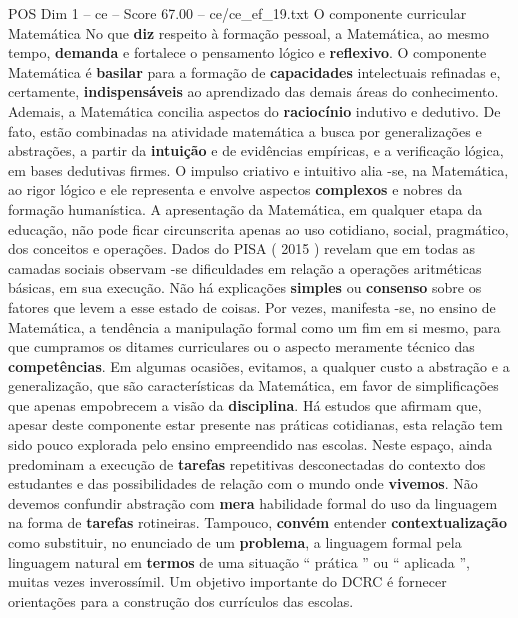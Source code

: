 \begin{textsample}{POS Dim 1 – ce – Score 67.00 – ce/ce\_ef\_19.txt}  \label{ex:f1_pos_047}
O componente curricular Matemática No que \textbf{diz} respeito à formação pessoal, a Matemática, ao mesmo tempo, \textbf{demanda} e fortalece o pensamento lógico e \textbf{reflexivo}.
O componente Matemática é \textbf{basilar} para a formação de \textbf{capacidades} intelectuais refinadas e, certamente, \textbf{indispensáveis} ao aprendizado das demais áreas do conhecimento.
Ademais, a Matemática concilia aspectos do \textbf{raciocínio} indutivo e dedutivo.
De fato, estão combinadas na atividade matemática a busca por generalizações e abstrações, a partir da \textbf{intuição} e de evidências empíricas, e a verificação lógica, em bases dedutivas firmes.
O impulso criativo e intuitivo alia -se, na Matemática, ao rigor lógico e ele representa e envolve aspectos \textbf{complexos} e nobres da formação humanística.
A apresentação da Matemática, em qualquer etapa da educação, não pode ficar circunscrita apenas ao uso cotidiano, social, pragmático, dos conceitos e operações.
Dados do PISA ( 2015 ) revelam que em todas as camadas sociais observam -se dificuldades em relação a operações aritméticas básicas, em sua execução.
Não há explicações \textbf{simples} ou \textbf{consenso} sobre os fatores que levem a esse estado de coisas.
Por vezes, manifesta -se, no ensino de Matemática, a tendência a manipulação formal como um fim em si mesmo, para que cumpramos os ditames curriculares ou o aspecto meramente técnico das \textbf{competências}.
Em algumas ocasiões, evitamos, a qualquer custo a abstração e a generalização, que são características da Matemática, em favor de simplificações que apenas empobrecem a visão da \textbf{disciplina}.
Há estudos que afirmam que, apesar deste componente estar presente nas práticas cotidianas, esta relação tem sido pouco explorada pelo ensino empreendido nas escolas.
Neste espaço, ainda predominam a execução de \textbf{tarefas} repetitivas desconectadas do contexto dos estudantes e das possibilidades de relação com o mundo onde \textbf{vivemos}.
Não devemos confundir abstração com \textbf{mera} habilidade formal do uso da linguagem na forma de \textbf{tarefas} rotineiras.
Tampouco, \textbf{convém} entender \textbf{contextualização} como substituir, no enunciado de um \textbf{problema}, a linguagem formal pela linguagem natural em \textbf{termos} de uma situação “ prática ” ou “ aplicada ”, muitas vezes inverossímil.
Um objetivo importante do DCRC é fornecer orientações para a construção dos currículos das escolas.

\end{textsample}
